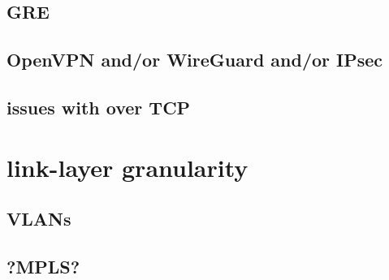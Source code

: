 \subsection{GRE}
\subsection{OpenVPN and/or WireGuard and/or IPsec}
\subsection{issues with over TCP}

\section{link-layer granularity}

\subsection{VLANs}

\subsection{?MPLS?}

